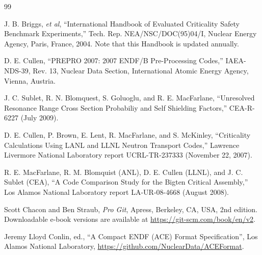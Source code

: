 \documentclass[11pt,twoside]{NJOYMan}
\begin{document}
\begin{thebibliography}{99}
\begin{singlespace}
 J. B. Briggs, {\it et al}, ``International Handbook
  of Evaluated Criticality Safety Benchmark Experiments,'' Tech. Rep.
  NEA/NSC/DOC(95)04/I, Nuclear Energy Agency, Paris, France, 2004.  Note
  that this Handbook is updated annually.

 D. E. Cullen, ``PREPRO 2007: 2007 ENDF/B Pre-Processing
  Codes,'' IAEA-NDS-39, Rev. 13, Nuclear Data Section, International
  Atomic Energy Agency, Vienna, Austria.

 J. C. Sublet, R. N. Blomquest,
  S. Goluoglu, and R. E. MacFarlane, ``Unresolved Resonance
  Range Cross Section Probabiliy and Self Shielding Factors,''
  CEA-R-6227 (July 2009).

 D. E. Cullen, P. Brown, E. Lent,
  R. MacFarlane, and S. McKinley, ``Criticality Calculations
  Using LANL and LLNL Neutron Transport Codes,'' Lawrence Livermore
  National Laboratory report UCRL-TR-237333 (November 22, 2007).

 R. E. MacFarlane, R. M. Blomquist (ANL),
  D. E. Cullen (LLNL), and J. C. Sublet (CEA),
  ``A Code Comparison Study for the Bigten Critical Assembly,''
  Los Alamos National Laboratory report LA-UR-08-4668 (August 2008).

 Scott Chacon and Ben Straub, {\it Pro Git}, Apress,
  Berkeley, CA, USA, 2nd edition.  Downloadable e-book versions
  are available at \url{https://git-scm.com/book/en/v2}.

 Jeremy Lloyd Conlin, ed., ``A Compact ENDF (ACE) Format Specification'', Los Alamos National Laboratory, \url{https://github.com/NuclearData/ACEFormat}.

\end{singlespace}
\end{thebibliography}

\cleardoublepage

\printindex
\end{document}
